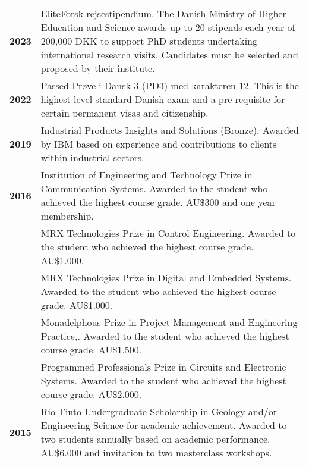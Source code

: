\documentclass[a4paper,11pt]{article}
\begin{document}
\noindent
\begin{tabular}{lp{}}
    \textbf{2023} & EliteForsk-rejsestipendium. \textcolor{subduedcolour}{The Danish Ministry of Higher Education and Science awards up to 20 stipends each year of 200,000 DKK to support PhD students undertaking international research visits. Candidates must be selected and proposed by their institute.} \\

    \textbf{2022} & Passed Prøve i Dansk 3 (PD3) med karakteren 12. \textcolor{subduedcolour}{This is the highest level standard Danish exam and a pre-requisite for certain permanent visas and citizenship.}\\

    \textbf{2019} & Industrial Products Insights and Solutions (Bronze). \textcolor{subduedcolour}{Awarded by IBM based on experience and contributions to clients within industrial sectors.} \\

    \textbf{2016} & Institution of Engineering and Technology Prize in Communication Systems. \textcolor{subduedcolour}{Awarded to the student who achieved the highest course grade. AU\$300 and one year membership.} \\

    & MRX Technologies Prize in Control Engineering. \textcolor{subduedcolour}{Awarded to the student who achieved the highest course grade. AU\$1.000.} \\

    & MRX Technologies Prize in Digital and Embedded Systems. \textcolor{subduedcolour}{Awarded to the student who achieved the highest course grade. AU\$1.000.} \\

    & Monadelphous Prize in Project Management and Engineering Practice,. \textcolor{subduedcolour}{Awarded to the student who achieved the highest course grade. AU\$1.500.} \\

    & Programmed Professionals Prize in Circuits and Electronic Systems. \textcolor{subduedcolour}{Awarded to the student who achieved the highest course grade. AU\$2.000.} \\

    \textbf{2015} & Rio Tinto Undergraduate Scholarship in Geology and/or Engineering Science for academic achievement. \textcolor{subduedcolour}{Awarded to two students annually based on academic performance. AU\$6.000 and invitation to two masterclass workshops.} \\


\end{tabular}
\end{document}
